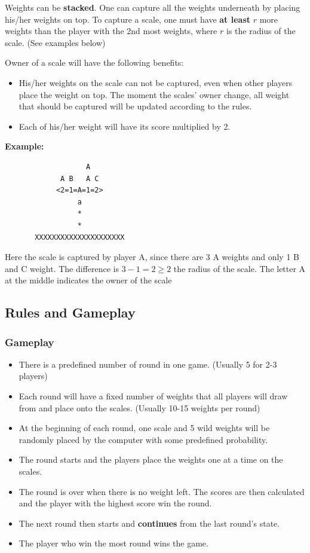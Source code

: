 \documentclass[12pt]{article}
\begin{document}
Weights can be \textbf{stacked}. One can capture all the weights underneath by
placing his/her weights on top. To capture a scale, one must have \textbf{at
least} $r$ more weights than the player with the 2nd most weights, where $r$ is
the radius of the scale. (See examples below)

Owner of a scale will have the following benefits:
\begin{itemize}
  \item His/her weights on the scale can not be captured, even when other
    players place the weight on top. The moment the scales' owner change, all
    weight that should be captured will be updated according to the rules.
  \item Each of his/her weight will have its score multiplied by 2.
\end{itemize}

\textbf{Example:}
\begin{verbatim}
                   A
             A B   A C
            <2=1=A=1=2>
                 a     
                 *     
                 *    
       XXXXXXXXXXXXXXXXXXXXX
\end{verbatim}

Here the scale is captured by player A, since there are 3 A weights and only 1 B
and C weight. The difference is $3 - 1 = 2 \geq 2$ the radius of the scale. The
letter A at the middle indicates the owner of the scale


\subsection{Rules and Gameplay} 
\subsubsection{Gameplay}
\begin{itemize}
  \item There is a predefined number of round in one game. (Usually 5 for 2-3
    players)
  \item Each round will have a fixed number of weights that all players will
    draw from and place onto the scales. (Usually 10-15 weights per round)
  \item At the beginning of each round, one scale and 5 wild weights will be
    randomly placed by the computer with some predefined probability.
  \item The round starts and the players place the weights one at a time on the
    scales. 
  \item The round is over when there is no weight left. The scores are then
    calculated and the player with the highest score win the round.
  \item The next round then starts and \textbf{continues} from the last round's
    state.
  \item The player who win the most round wins the game.
\end{itemize}
\end{document}
